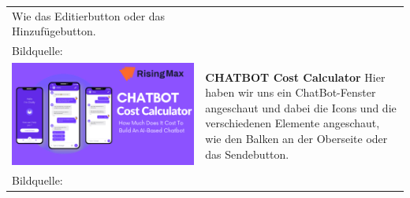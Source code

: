\begin{tabular}{C{6cm}  L{7cm}}
    Wie das Editierbutton oder das Hinzufügebutton.                                                                                  \\
    Bildquelle:\cite{briar} \newline                                                                                                 \\
    \includegraphics[width=\linewidth]{bilder/research pic/chatbot-cost-calculator.png} & \textbf{CHATBOT Cost Calculator} \newline
    Hier haben wir uns ein ChatBot-Fenster angeschaut und dabei die Icons und die
    verschiedenen Elemente angeschaut, wie den Balken an der Oberseite oder das Sendebutton.                                         \\
    Bildquelle:\cite{chatbotcostcalc} \newline
\end{tabular}

